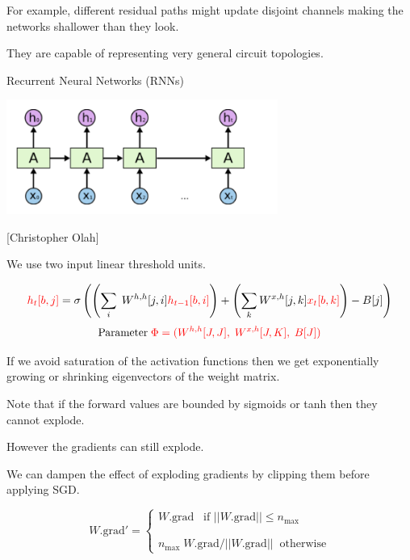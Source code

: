 {\begin{minipage}[b]{4in}
  \bigskip
  \bigskip
  For example, different residual paths might update disjoint channels making the networks shallower than they look.

  \bigskip
  \bigskip
  They are capable of representing very general circuit topologies.
\end{minipage}

\slideplain{}
\vfill
\centerline{Recurrent Neural Networks (RNNs)}
\vfill
\vfill




\centerline{\includegraphics[width=3.5in]{../images/RNN}}
\centerline{{\large [Christopher Olah]}}

We use two input linear threshold units.

{\huge
$${\color{red} h_t[b,j]} = \sigma\left(\left(\sum_i\;W^{h,h}[j,i]{\color{red} h_{t-1}[b,i]}\right) + \left(\sum_k W^{x,h}[j,k]{\color{red} x_t[b,k]}\right) - B[j]\right)$$
}
\vfill
$$\mathrm{Parameter}\;{\color{red} \Phi = (W^{h,h}[J,J],\;W^{x,h}[J,K],\;B[J])}$$



\vfill
If we avoid saturation of the activation functions then we get exponentially growing or shrinking eigenvectors of the weight matrix.

\vfill
Note that if the forward values are bounded by sigmoids or tanh then they cannot explode.

\vfill
However the gradients can still explode.


\vfill
We can dampen the effect of exploding gradients by clipping them before applying SGD.

\vfill
$$W.\mathrm{grad'} = \left\{\begin{array}{l} W.\mathrm{grad} \;\;\;\mbox{if $||W.\mathrm{grad}|| \leq n_{\mathrm{max}}$} \\
                                                      \\ \\
                                                      n_{\mathrm{max}} \; W.\mathrm{grad} / ||W.\mathrm{grad}|| \;\; \mbox{otherwise}
\end{array} \right.$$

}
